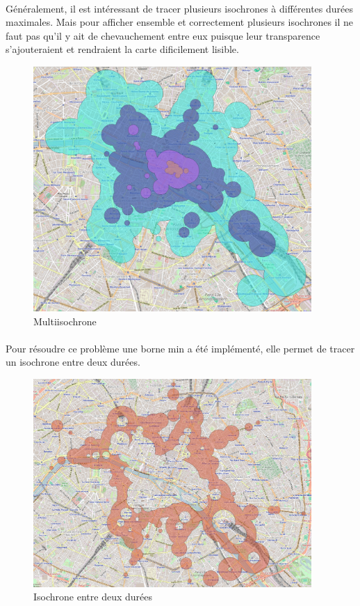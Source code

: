 \documentclass[a4paper]{report}
\begin{document}
\paragraph{} Généralement, il est intéressant de tracer plusieurs isochrones à différentes durées maximales. Mais pour afficher ensemble et correctement plusieurs isochrones il ne faut pas qu'il y ait de chevauchement entre eux puisque leur transparence s'ajouteraient et rendraient la carte dificilement lisible.

\begin{figure}[H]
	\begin{center}
		\includegraphics[width=300pt]{image/multi_iso}
		\caption{Multiisochrone}
		\label{Multiisocrone}
	\end{center}	
\end{figure}

\paragraph{} Pour résoudre ce problème une borne min a été implémenté, elle permet de tracer un isochrone entre deux durées. 

\begin{figure}[H]
	\begin{center}
		\includegraphics[width=300pt]{image/iso_min}
		\caption{Isochrone entre deux durées}
		\label{Isochrone entre deux durées}
	\end{center}	
\end{figure}
\end{document}
